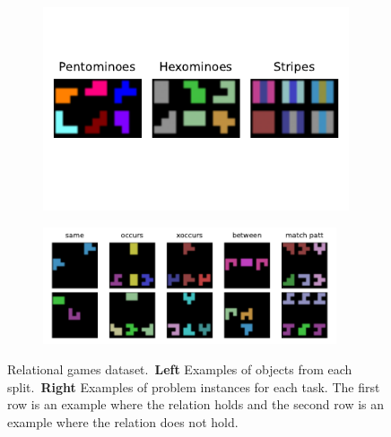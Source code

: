\begin{figure}[t]
    \centering
    \begin{subfigure}[t]{0.37\textwidth}
        \centering
        \includegraphics[width=0.99\textwidth]{figs/relational_games_objects.pdf}
    \end{subfigure}
    \begin{subfigure}[t]{0.62\textwidth}
        \centering
        \includegraphics[width=0.95\textwidth]{figs/relational_games_tasks.pdf}
    \end{subfigure}
    \caption{Relational games dataset.~\textbf{Left} Examples of objects from each split.~\textbf{Right} Examples of problem instances for each task. The first row is an example where the relation holds and the second row is an example where the relation does not hold.}\label{fig:relational_games_dataset}
\end{figure}

